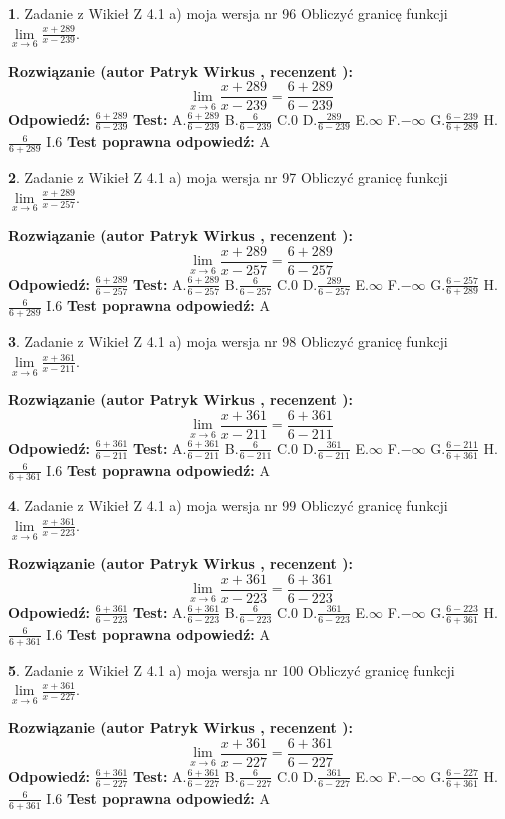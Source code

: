 \documentclass[12pt, a4paper]{article}
\theoremstyle{definition} %
\newtheorem{zad}{}
\newcommand{\zadStart}[1]{\begin{zad}#1\newline}
\newcommand{\zadStop}{\end{zad}}
\newcommand{\rozwStart}[2]{\noindent \textbf{Rozwiązanie (autor #1 , recenzent #2): }\newline}
\newcommand{\rozwStop}{\newline}
\newcommand{\odpStart}{\noindent \textbf{Odpowiedź:}\newline}
\newcommand{\odpStop}{\newline}
\newcommand{\testStart}{\noindent \textbf{Test:}\newline}
\newcommand{\testStop}{\newline}
\newcommand{\kluczStart}{\noindent \textbf{Test poprawna odpowiedź:}\newline}
\newcommand{\kluczStop}{\newline}
\begin{document}
\zadStart{Zadanie z Wikieł Z 4.1 a) moja wersja nr 96}
Obliczyć granicę funkcji $\lim\limits_{x\to6}\frac{x+289}{x-239}$.
\zadStop
\rozwStart{Patryk Wirkus}{}
$$\lim\limits_{x\to6}\frac{x+289}{x-239} = \frac{6+289}{6-239}$$
\rozwStop
\odpStart
$\frac{6+289}{6-239}$
\odpStop
\testStart
A.$\frac{6+289}{6-239}$
B.$\frac{6}{6-239}$
C.$0$
D.$\frac{289}{6-239}$
E.$\infty$
F.$-\infty$
G.$\frac{6-239}{6+289}$
H.$\frac{6}{6+289}$
I.$6$
\testStop
\kluczStart
A
\kluczStop



\zadStart{Zadanie z Wikieł Z 4.1 a) moja wersja nr 97}
Obliczyć granicę funkcji $\lim\limits_{x\to6}\frac{x+289}{x-257}$.
\zadStop
\rozwStart{Patryk Wirkus}{}
$$\lim\limits_{x\to6}\frac{x+289}{x-257} = \frac{6+289}{6-257}$$
\rozwStop
\odpStart
$\frac{6+289}{6-257}$
\odpStop
\testStart
A.$\frac{6+289}{6-257}$
B.$\frac{6}{6-257}$
C.$0$
D.$\frac{289}{6-257}$
E.$\infty$
F.$-\infty$
G.$\frac{6-257}{6+289}$
H.$\frac{6}{6+289}$
I.$6$
\testStop
\kluczStart
A
\kluczStop



\zadStart{Zadanie z Wikieł Z 4.1 a) moja wersja nr 98}
Obliczyć granicę funkcji $\lim\limits_{x\to6}\frac{x+361}{x-211}$.
\zadStop
\rozwStart{Patryk Wirkus}{}
$$\lim\limits_{x\to6}\frac{x+361}{x-211} = \frac{6+361}{6-211}$$
\rozwStop
\odpStart
$\frac{6+361}{6-211}$
\odpStop
\testStart
A.$\frac{6+361}{6-211}$
B.$\frac{6}{6-211}$
C.$0$
D.$\frac{361}{6-211}$
E.$\infty$
F.$-\infty$
G.$\frac{6-211}{6+361}$
H.$\frac{6}{6+361}$
I.$6$
\testStop
\kluczStart
A
\kluczStop



\zadStart{Zadanie z Wikieł Z 4.1 a) moja wersja nr 99}
Obliczyć granicę funkcji $\lim\limits_{x\to6}\frac{x+361}{x-223}$.
\zadStop
\rozwStart{Patryk Wirkus}{}
$$\lim\limits_{x\to6}\frac{x+361}{x-223} = \frac{6+361}{6-223}$$
\rozwStop
\odpStart
$\frac{6+361}{6-223}$
\odpStop
\testStart
A.$\frac{6+361}{6-223}$
B.$\frac{6}{6-223}$
C.$0$
D.$\frac{361}{6-223}$
E.$\infty$
F.$-\infty$
G.$\frac{6-223}{6+361}$
H.$\frac{6}{6+361}$
I.$6$
\testStop
\kluczStart
A
\kluczStop



\zadStart{Zadanie z Wikieł Z 4.1 a) moja wersja nr 100}
Obliczyć granicę funkcji $\lim\limits_{x\to6}\frac{x+361}{x-227}$.
\zadStop
\rozwStart{Patryk Wirkus}{}
$$\lim\limits_{x\to6}\frac{x+361}{x-227} = \frac{6+361}{6-227}$$
\rozwStop
\odpStart
$\frac{6+361}{6-227}$
\odpStop
\testStart
A.$\frac{6+361}{6-227}$
B.$\frac{6}{6-227}$
C.$0$
D.$\frac{361}{6-227}$
E.$\infty$
F.$-\infty$
G.$\frac{6-227}{6+361}$
H.$\frac{6}{6+361}$
I.$6$
\testStop
\kluczStart
A
\kluczStop
\end{document}
